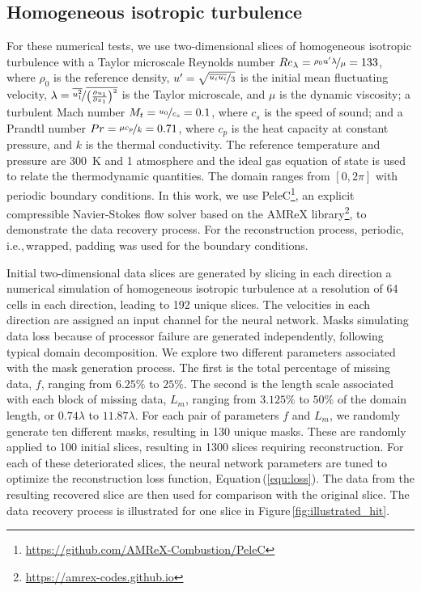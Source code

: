 \documentclass[review]{elsarticle}
\begin{document}
\subsection{Homogeneous isotropic turbulence}\label{sec:hit}

For these numerical tests, we use two-dimensional slices of
homogeneous isotropic turbulence with a Taylor microscale Reynolds
number $Re_\lambda= \nicefrac{\rho_0 u' \lambda}{\mu}=133$, where
$\rho_0$ is the reference density,
$u' = \sqrt{\nicefrac{\overline{u_i u_i}}{3}}$ is the initial mean
fluctuating velocity,
$\lambda = \nicefrac{\overline{u_1^2}}{\overline{\left(\frac{\partial
        u_1}{\partial x_1}\right)^2}}$ is the Taylor microscale, and
$\mu$ is the dynamic viscosity; a turbulent Mach number
$M_t = \nicefrac{u_0}{c_s} = 0.1$, where $c_s$ is the speed of sound;
and a Prandtl number $Pr = \nicefrac{\mu c_p}{k} = 0.71$, where $c_p$
is the heat capacity at constant pressure, and $k$ is the thermal
conductivity. The reference temperature and pressure are 300~K and 1
atmosphere and the ideal gas equation of state is used to relate the
thermodynamic quantities. The domain ranges from $[0,2\pi]$ with
periodic boundary conditions. In this work, we use
PeleC\footnote{\url{https://github.com/AMReX-Combustion/PeleC}}, an
explicit compressible Navier-Stokes flow solver based on the AMReX
library\footnote{\url{https://amrex-codes.github.io}}, to demonstrate
the data recovery process. For the reconstruction process, periodic,
i.e.,\,wrapped, padding was used for the boundary conditions.

Initial two-dimensional data slices are generated by slicing in each
direction a numerical simulation of homogeneous isotropic turbulence
at a resolution of 64 cells in each direction, leading to 192 unique
slices. The velocities in each direction are assigned an input channel
for the neural network. Masks simulating data loss because of processor
failure are generated independently, following typical domain
decomposition. We explore two different parameters associated with the
mask generation process. The first is the total percentage of missing
data, $f$, ranging from $6.25\%$ to $25\%$. The second is the length
scale associated with each block of missing data, $L_m$, ranging from
$3.125\%$ to $50\%$ of the domain length, or $0.74\lambda$ to
$11.87\lambda$. For each pair of parameters $f$ and $L_m$, we randomly
generate ten different masks, resulting in 130 unique masks. These are
randomly applied to 100 initial slices, resulting in 1300 slices
requiring reconstruction. For each of these deteriorated slices, the
neural network parameters are tuned to optimize the reconstruction
loss function, Equation\,(\ref{equ:loss}). The data from the resulting
recovered slice are then used for comparison with the original
slice. The data recovery process is illustrated for one slice in
Figure\,\ref{fig:illustrated_hit}.
\end{document}

